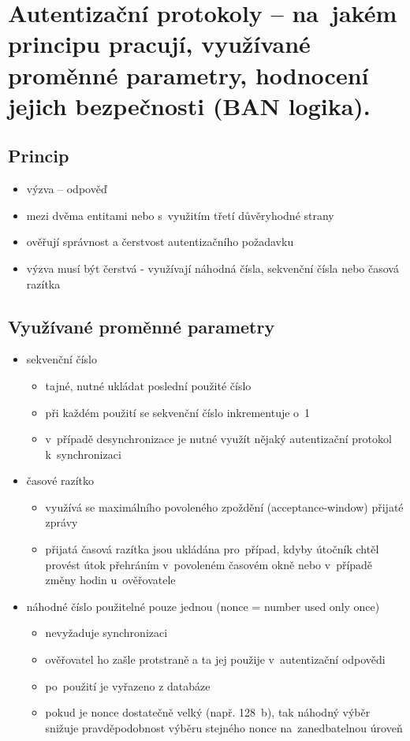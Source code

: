 \clearpage
\section{Autentizační protokoly -- na~jakém principu pracují, využívané proměnné parametry, hodnocení jejich bezpečnosti (BAN logika).}

\subsection{Princip}
\begin{itemize}
    \item výzva -- odpověď
    \item mezi dvěma entitami nebo s~využitím třetí důvěryhodné strany
    \item ověřují správnost a čerstvost autentizačního požadavku
    \item výzva musí být čerstvá - využívají náhodná čísla, sekvenční čísla nebo časová razítka
\end{itemize}

\subsection{Využívané proměnné parametry}
\begin{itemize}
    \item sekvenční číslo
    \begin{itemize}
        \item tajné, nutné ukládat poslední použité číslo
        \item při každém použití se sekvenční číslo inkrementuje o~1
        \item v~případě desynchronizace je nutné využít nějaký autentizační protokol k~synchronizaci
    \end{itemize}
    \item časové razítko
    \begin{itemize}
        \item využívá se maximálního povoleného zpoždění (acceptance-window) přijaté zprávy
        \item přijatá časová razítka jsou ukládána pro~případ, kdyby útočník chtěl provést útok přehráním v~povoleném časovém okně nebo v~případě změny hodin u~ověřovatele
    \end{itemize}
    \item náhodné číslo použitelné pouze jednou (nonce = number used only once)
    \begin{itemize}
        \item nevyžaduje synchronizaci
        \item ověřovatel ho zašle protstraně a ta jej použije v~autentizační odpovědi
        \item po~použití je vyřazeno z databáze
        \item pokud je nonce dostatečně velký (např. 128~b), tak náhodný výběr snižuje pravděpodobnost výběru stejného nonce na~zanedbatelnou úroveň
    \end{itemize}
\end{itemize}

